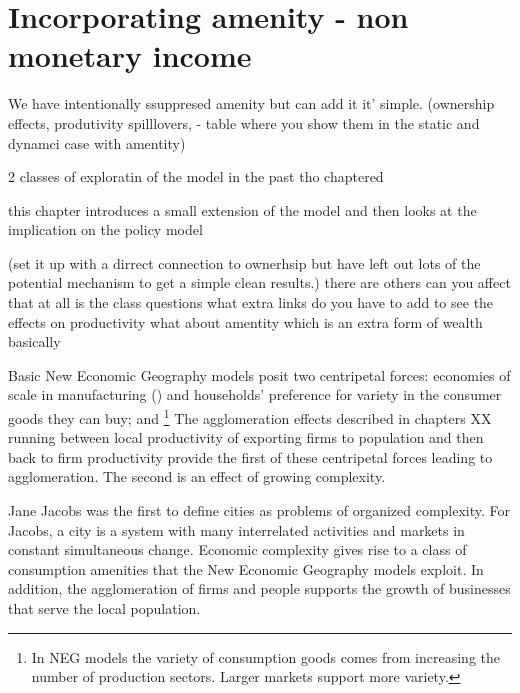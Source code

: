 \chapter[Amenity]{Incorporating amenity - non monetary income}\label{appendix-amenity}

We have intentionally ssuppresed amenity but can add it it' simple.
(ownership effects, produtivity spilllovers, - table where you show them in the static and dynamci case with amentity)

2 classes of exploratin of the model in the past tho chaptered

this chapter introduces a small extension of the model and then looks at the implication on the policy model

(set it up with a dirrect connection to ownerhsip but have left out lots of the potential mechanism to get a simple clean results.) there are others
can you affect that at all is the class questions
what extra links do you have to add to see the effects on productivity
what about amentity which is an extra form of wealth basically


Basic New Economic Geography models posit two centripetal forces: economies of scale in manufacturing (\cite{gurwitzCatastrophicAgglomeration2019}) and households' preference for variety in the consumer goods they can buy; and \footnote{In NEG models the variety of consumption goods comes from increasing the number of  production sectors. Larger markets support more variety.} The agglomeration effects described in chapters XX  running between local productivity  of exporting firms to population and then back to firm productivity provide the first of these centripetal forces leading to agglomeration. The second is an effect of growing complexity. 

Jane Jacobs was the first to define cities as problems of organized complexity. For Jacobs, a city is a system with many interrelated activities and markets  in constant simultaneous change. Economic complexity gives rise to a class of consumption amenities that the New Economic Geography models exploit. In addition, the agglomeration of firms and people supports the growth of  businesses that serve  the local population. 

